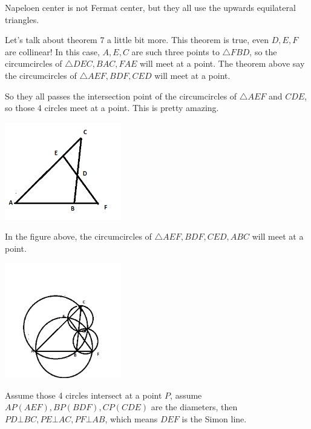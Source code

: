 Napeloen center is not Fermat center, but they all use the upwards equilateral triangles.

Let's talk about theorem 7 a little bit more. This theorem is true, even $D, E, F$ are collinear!
In this case, $A, E, C$ are such three points to $\triangle FBD$, so the circumcircles of $\triangle DEC, BAC, FAE$
will meet at a point. The theorem above say the circumcircles of $\triangle AEF, BDF, CED$ will meet at a point.

So they all passes the intersection point of the circumcircles of $\triangle AEF$ and $CDE$, so those 4 circles
meet at a point. This is pretty amazing.

\includegraphics[width=2in]{theorem9}

\begin{theorem}
In the figure above, the circumcircles of $\triangle AEF, BDF, CED, ABC$ will meet at a point.
\end{theorem}

\includegraphics[width=2in]{theorem10}


Assume those 4 circles intersect at a point $P$, 
assume $AP(AEF), BP(BDF), CP(CDE)$ are the diameters, then $PD\bot BC, PE\bot AC, PF\bot AB$, 
which means $DEF$ is the Simon line.